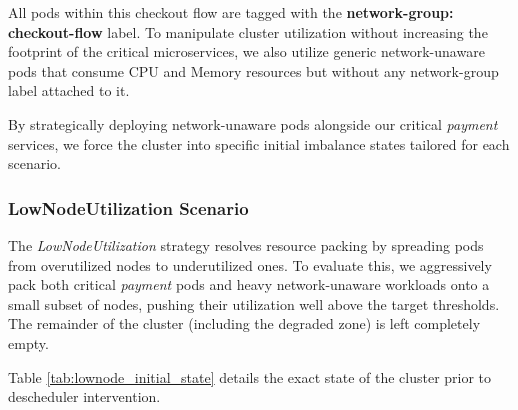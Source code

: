 All pods within this checkout flow are tagged with the \textbf{network-group: checkout-flow} label. To manipulate cluster utilization without increasing the footprint of the critical microservices, we also utilize generic network-unaware pods that consume CPU and Memory resources but without any network-group label attached to it.

By strategically deploying network-unaware pods alongside our critical \textit{payment} services, we force the cluster into specific initial imbalance states tailored for each scenario.

\subsubsection{LowNodeUtilization Scenario}
\label{subsubsec:netaware4_workload_lownode}
The \textit{LowNodeUtilization} strategy resolves resource packing by spreading pods from overutilized nodes to underutilized ones. To evaluate this, we aggressively pack both critical \textit{payment} pods and heavy network-unaware workloads onto a small subset of nodes, pushing their utilization well above the target thresholds. The remainder of the cluster (including the degraded zone) is left completely empty.

Table \ref{tab:lownode_initial_state} details the exact state of the cluster prior to descheduler intervention.

\begin{table}[H]
    \centering
    \caption{Resource Allocation: Initial State for LowNodeUtilization Strategy}
    \label{tab:lownode_initial_state}
\end{table}

